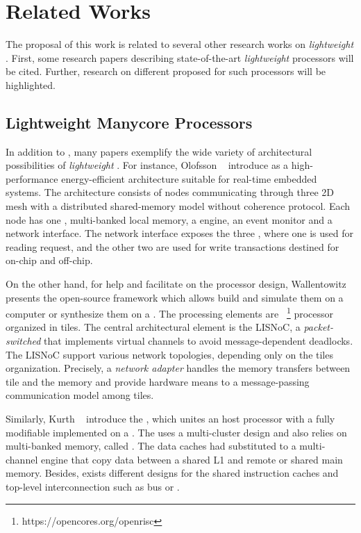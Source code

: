 \chapter{Related Works}
\label{ch.related-works}

The proposal of this work is related to several other research works
on \textit{lightweight} \manycores.
First, some research papers describing state-of-the-art \textit{lightweight} \manycores
processors will be cited. Further, research on different \oses
proposed for such processors will be highlighted.

\section{Lightweight Manycore Processors}
\label{sec.works.manycores}

	In addition to \mppa, many papers exemplify the wide variety of architectural
	possibilities of \textit{lightweight} \manycores.
	For instance, Olofsson \etal~\cite{olofsson2014} introduce \epiphany as a
	high-performance energy-efficient \manycore architecture suitable for
	real-time embedded systems.
	The architecture consists of nodes communicating through three 2D mesh \nocs
	with a distributed shared-memory model without coherence protocol.
	Each node has one \risc \cpu, multi-banked local memory, a \dma engine,
	an event monitor and a network interface.
	The network interface exposes the three \nocs, where one is used for reading
	request, and the other two are used for write transactions destined for on-chip
	and off-chip.

	On the other hand, for help and facilitate on the \manycore processor design,
	Wallentowitz \etal~\cite{Wallentowitz2013} presents the open-source framework
	\optimsoc which allows build \manycore \soc and simulate them on a computer or
	synthesize them on a \fpga.
	The processing elements are \openrisc~\footnote{https://opencores.org/openrisc}
	processor organized in tiles.
	The central architectural element is the LISNoC, a \textit{packet-switched \noc}
	that implements virtual channels to avoid message-dependent deadlocks.
	The LISNoC support various network topologies, depending only on the tiles organization.
	Precisely, a \textit{network adapter} handles the memory transfers between
	tile and the memory and provide hardware means to a message-passing communication
	model among tiles.

	Similarly, Kurth \etal~\cite{Kurth2017} introduce the \hero, which unites an \arm
	host processor with a fully modifiable \riscv \manycore implemented on a \fpga.
	The \pmca uses a multi-cluster design and also relies on multi-banked memory, called \spm.
	The data caches had substituted to a multi-channel \dma engine that copy data
	between a shared L1 \spm and remote \spms or shared main memory.
	Besides, exists different designs for the shared instruction caches and
	top-level interconnection such as bus or \noc.

